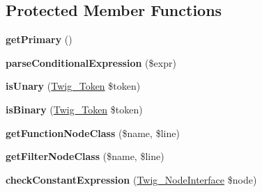 \subsection*{Protected Member Functions}
\begin{DoxyCompactItemize}
\item 
\hypertarget{class_twig___expression_parser_ad3c735d971b18f6f257dd9262d628f00}{}{\bfseries get\+Primary} ()\label{class_twig___expression_parser_ad3c735d971b18f6f257dd9262d628f00}

\item 
\hypertarget{class_twig___expression_parser_aa7c8eaf0835312785a61fca03baa062b}{}{\bfseries parse\+Conditional\+Expression} (\$expr)\label{class_twig___expression_parser_aa7c8eaf0835312785a61fca03baa062b}

\item 
\hypertarget{class_twig___expression_parser_ac819054852f12938e03d283e9002bfae}{}{\bfseries is\+Unary} (\hyperlink{class_twig___token}{Twig\+\_\+\+Token} \$token)\label{class_twig___expression_parser_ac819054852f12938e03d283e9002bfae}

\item 
\hypertarget{class_twig___expression_parser_a94df003406378be0d7c78f6ff1fd12ba}{}{\bfseries is\+Binary} (\hyperlink{class_twig___token}{Twig\+\_\+\+Token} \$token)\label{class_twig___expression_parser_a94df003406378be0d7c78f6ff1fd12ba}

\item 
\hypertarget{class_twig___expression_parser_ac85cfaf30eb3bc32f566786d0f1791ff}{}{\bfseries get\+Function\+Node\+Class} (\$name, \$line)\label{class_twig___expression_parser_ac85cfaf30eb3bc32f566786d0f1791ff}

\item 
\hypertarget{class_twig___expression_parser_a33ad151dffb8286fa3a54fc845dc0c6c}{}{\bfseries get\+Filter\+Node\+Class} (\$name, \$line)\label{class_twig___expression_parser_a33ad151dffb8286fa3a54fc845dc0c6c}

\item 
\hypertarget{class_twig___expression_parser_a8ce9c84d646fc4bd779027171ea9f3ef}{}{\bfseries check\+Constant\+Expression} (\hyperlink{interface_twig___node_interface}{Twig\+\_\+\+Node\+Interface} \$node)\label{class_twig___expression_parser_a8ce9c84d646fc4bd779027171ea9f3ef}

\end{DoxyCompactItemize}
